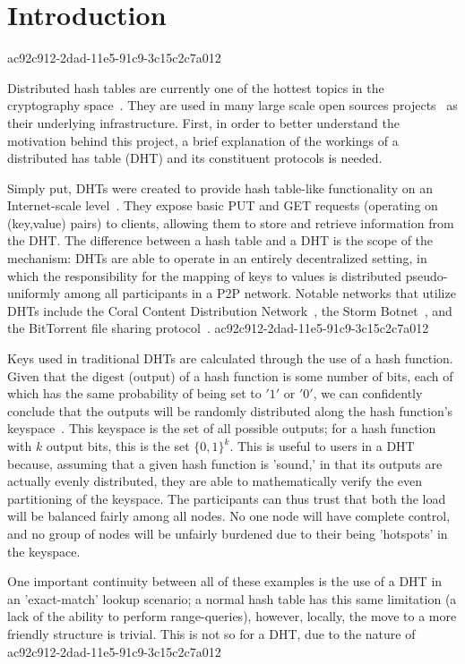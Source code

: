 \documentclass[12pt]{article}
\begin{document}
\section{Introduction}
ac92c912-2dad-11e5-91c9-3c15c2c7a012\par Distributed hash tables are currently one of the hottest topics in the cryptography space~\cite{Stoica:2001dj,Rowstron:2001ea,Ratnasamy:2001wn}. They are used in many large scale open sources projects~\cite{Freitas:2013tb,Xu:2010vs,Perfitt:2010fh} as their underlying infrastructure. First, in order to better understand the motivation behind this project, a brief explanation of the workings of a distributed has table (DHT) and its constituent protocols is needed.

\par Simply put, DHTs were created to provide hash table-like functionality on an Internet-scale level~\cite{Ratnasamy:2001wn}. They expose basic PUT and GET requests (operating on (key,value) pairs) to clients, allowing them to store and retrieve information from the DHT. The difference between a hash table and a DHT is the scope of the mechanism: DHTs are able to operate in an entirely decentralized setting, in which the responsibility for the mapping of keys to values is distributed pseudo-uniformly among all participants in a P2P network. Notable networks that utilize DHTs include the Coral Content Distribution Network~\cite{Freedman:2004vb}, the Storm Botnet~\cite{Holz:2008uk}, and the BitTorrent file sharing protocol~\cite{Cohen:y1_8mBnw}.
ac92c912-2dad-11e5-91c9-3c15c2c7a012
\par Keys used in traditional DHTs are calculated through the use of a hash function. Given that the digest (output) of a hash function is some number of bits, each of which has the same probability of being set to $'1'$ or $'0'$, we can confidently conclude that the outputs will be randomly distributed along the hash function's keyspace~. This keyspace is the set of all possible outputs; for a hash function with $k$ output bits, this is the set $\{0,1\}^k$. This is useful to users in a DHT because, assuming that a given hash function is 'sound,' in that its outputs are actually evenly distributed, they are able to mathematically verify the even partitioning of the keyspace. The participants can thus trust that both the load will be balanced fairly among all nodes. No one node will have complete control, and no group of nodes will be unfairly burdened due to their being 'hotspots' in the keyspace.~

\par One important continuity between all of these examples is the use of a DHT in an 'exact-match' lookup scenario; a normal hash table has this same limitation (a lack of the ability to perform range-queries), however, locally, the move to a more friendly structure is trivial. This is not so for a DHT, due to the nature of
ac92c912-2dad-11e5-91c9-3c15c2c7a012\printbibliography
\end{document}
